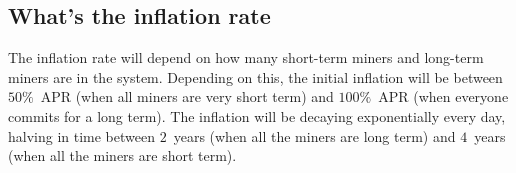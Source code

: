 \documentclass[longbibliography,nofootinbib,twocolumn]{revtex4-1}
\begin{document}
\subsection{What's the inflation rate}
The inflation rate will depend on how many short-term miners and long-term miners are in the system.
Depending on this, the initial inflation will be between $50\%$~APR (when all miners are very short term) and $100\%$~APR (when everyone commits for a long
term).
The inflation will be decaying exponentially every day, halving in time between $2$~years (when all the miners are long term)
and $4$~years (when all the miners are short term).


\end{document}
